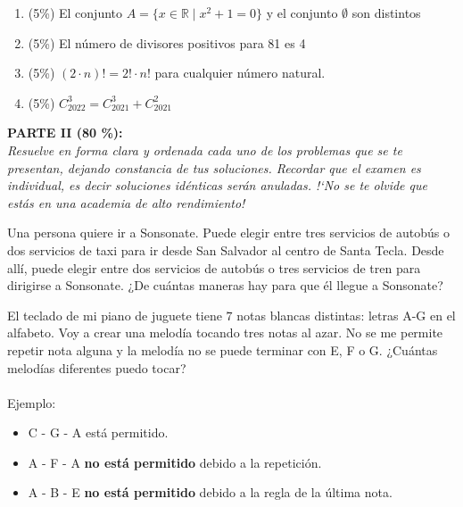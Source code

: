 \documentclass[12pt]{article}
\begin{document}
  \begin{enumerate}
\item (5\%) El conjunto $A=\{ x\in \mathbb{R}\mid x^2+1=0\}$ y el conjunto $\emptyset$ son distintos \dotfill{\bf \rule{1.5cm}{0.7pt}}
\item (5\%) El número de divisores positivos para 81 es 4\dotfill{\bf \rule{1.5cm}{0.7pt}}
\item (5\%)  $(2\cdot n)!=2!\cdot n!$ para cualquier número natural.\dotfill{\bf \rule{1.5cm}{0.7pt}}
 \item (5\%) $C^3_{2022}=C^3_{2021}+C^2_{2021}$\dotfill{\bf \rule{1.5cm}{0.7pt}}
\end{enumerate}


{\bf PARTE II (80 \%):}\\
\textit{Resuelve en forma clara y ordenada cada uno de los problemas que se te 
presentan, dejando constancia de tus soluciones. Recordar que el examen es individual, es decir soluciones id\'enticas ser\'an anuladas. !`No se te olvide que est\'as 
en una academia de alto rendimiento!}


\begin{problema}
Una persona quiere ir a Sonsonate. Puede elegir entre tres servicios de autobús o dos servicios de taxi para ir desde San Salvador al centro de Santa Tecla. Desde allí, puede elegir entre dos servicios de autobús o tres servicios de tren para dirigirse a Sonsonate. ¿De cuántas maneras hay para que él llegue a Sonsonate?
\end{problema}

\begin{problema}
El teclado de mi piano de juguete tiene $7$ notas blancas distintas: letras A-G en el alfabeto. Voy a crear una melodía tocando tres notas al azar. No se me permite repetir  nota alguna y la melodía no se puede terminar con E, F o G. ¿Cuántas melodías diferentes puedo tocar?\\\\
Ejemplo:
\begin{itemize}
    \item C - G - A está permitido.
    \item A - F - A \textbf{no está permitido} debido a la repetición.
    \item A - B - E \textbf{no está permitido} debido a la regla de la última nota.
\end{itemize}
\end{problema}

\newpage
\end{document}
